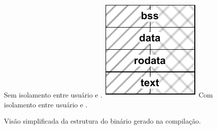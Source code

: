 \begin{figure}[tb]
	\centering
	
    \caption{Visão simplificada da estrutura do binário gerado na compilação.}%
                   {Sem isolamento entre usuário e .}
                   {\vspace{31mm}\includegraphics[width=\textwidth]{content/images/binary-structure-original.pdf}}
	\qquad
                   {Com isolamento entre usuário e .}

\end{figure}
